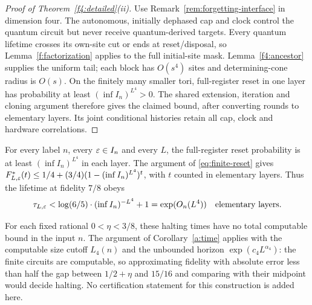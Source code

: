 \begin{proof}[Proof of Theorem~\ref{f4:detailed}(ii)]
Use Remark~\ref{rem:forgetting-interface} in dimension four. The autonomous, initially dephased cap and clock control the quantum circuit but never receive quantum-derived targets. Every quantum lifetime crosses its own-site cut or ends at reset/disposal, so Lemma~\ref{f:factorization} applies to the full initial-site mask. Lemma~\ref{f4:ancestor} supplies the uniform tail; each block has \(O(s^4)\) sites and determining-cone radius is \(O(s)\). On the finitely many smaller tori, full-register reset in one layer has probability at least \((\inf I_n)^{L^4}>0\). The shared extension, iteration and cloning argument therefore gives the claimed bound, after converting rounds to elementary layers. Its joint conditional histories retain all cap, clock and hardware correlations.
\end{proof}

For every label \(n\), every \(\varepsilon\in I_n\) and every \(L\), the
full-register reset probability is at least \((\inf I_n)^{L^4}\)
in each layer. The argument of \eqref{eq:finite-reset} gives
\(F^*_{L,\varepsilon}(t)\le 1/4+(3/4)(1-(\inf I_n)^{L^4})^t\), with \(t\)
counted in elementary layers. Thus the lifetime at fidelity \(7/8\) obeys
\begin{equation}\label{f4:lifetime-upper}
 \tau_{L,\varepsilon}<\log(6/5)\cdot(\inf I_n)^{-L^4}+1=\exp(O_n(L^4))
 \quad\text{elementary layers}.
\end{equation}

For each fixed rational \(0<\eta<3/8\), these halting times have no total computable bound in the input \(n\). The argument of Corollary~\ref{a:time} applies with the computable size cutoff \(L_4(n)\) and the unbounded horizon \(\exp(c_4L^{\alpha_4})\): the finite circuits are computable, so approximating fidelity with absolute error less than half the gap between \(1/2+\eta\) and \(15/16\) and comparing with their midpoint would decide halting. No certification statement for this construction is added here.
